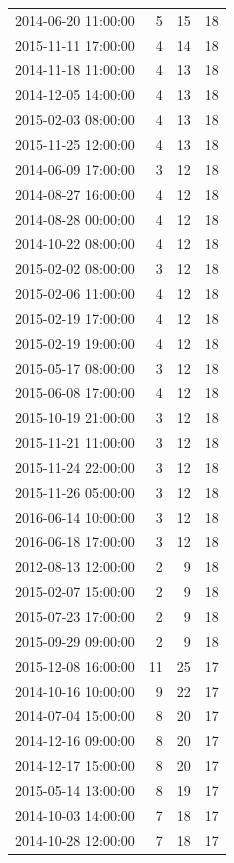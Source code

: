 \begin{tabular}{lrrr}
2014-06-20 11:00:00 & 5 & 15 & 18 \\
2015-11-11 17:00:00 & 4 & 14 & 18 \\
2014-11-18 11:00:00 & 4 & 13 & 18 \\
2014-12-05 14:00:00 & 4 & 13 & 18 \\
2015-02-03 08:00:00 & 4 & 13 & 18 \\
2015-11-25 12:00:00 & 4 & 13 & 18 \\
2014-06-09 17:00:00 & 3 & 12 & 18 \\
2014-08-27 16:00:00 & 4 & 12 & 18 \\
2014-08-28 00:00:00 & 4 & 12 & 18 \\
2014-10-22 08:00:00 & 4 & 12 & 18 \\
2015-02-02 08:00:00 & 3 & 12 & 18 \\
2015-02-06 11:00:00 & 4 & 12 & 18 \\
2015-02-19 17:00:00 & 4 & 12 & 18 \\
2015-02-19 19:00:00 & 4 & 12 & 18 \\
2015-05-17 08:00:00 & 3 & 12 & 18 \\
2015-06-08 17:00:00 & 4 & 12 & 18 \\
2015-10-19 21:00:00 & 3 & 12 & 18 \\
2015-11-21 11:00:00 & 3 & 12 & 18 \\
2015-11-24 22:00:00 & 3 & 12 & 18 \\
2015-11-26 05:00:00 & 3 & 12 & 18 \\
2016-06-14 10:00:00 & 3 & 12 & 18 \\
2016-06-18 17:00:00 & 3 & 12 & 18 \\
2012-08-13 12:00:00 & 2 & 9 & 18 \\
2015-02-07 15:00:00 & 2 & 9 & 18 \\
2015-07-23 17:00:00 & 2 & 9 & 18 \\
2015-09-29 09:00:00 & 2 & 9 & 18 \\
2015-12-08 16:00:00 & 11 & 25 & 17 \\
2014-10-16 10:00:00 & 9 & 22 & 17 \\
2014-07-04 15:00:00 & 8 & 20 & 17 \\
2014-12-16 09:00:00 & 8 & 20 & 17 \\
2014-12-17 15:00:00 & 8 & 20 & 17 \\
2015-05-14 13:00:00 & 8 & 19 & 17 \\
2014-10-03 14:00:00 & 7 & 18 & 17 \\
2014-10-28 12:00:00 & 7 & 18 & 17 \\

\end{tabular}
